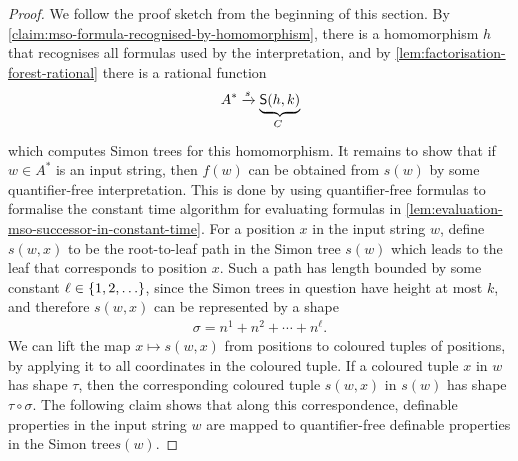 \begin{proof} We follow the proof sketch from  the beginning of this section. By 
    \cref{claim:mso-formula-recognised-by-homomorphism}, there is a homomorphism $h$ that recognises all formulas used by the \mso interpretation, and by \cref{lem:factorisation-forest-rational} there is a rational function
    \begin{align*}
    A^* \xrightarrow s \myunderbrace{\facttype {h,k}}{$C$}
    \end{align*}
    which computes Simon trees for this homomorphism. 
    It remains to show that if $w \in A^*$ is an input string, then  $f(w)$ can be obtained from $s(w)$ by some quantifier-free interpretation.  This is done by using quantifier-free formulas to formalise the constant time algorithm for evaluating \mso formulas in  \cref{lem:evaluation-mso-successor-in-constant-time}.
 For a position $x$  in the input string $w$, define $s(w,x)$  to be the root-to-leaf path in the Simon tree $s(w)$ which leads to the leaf that corresponds to position $x$. Such a path has length bounded by some constant $\ell \in \{1,2,\ldots\}$, since the Simon trees in question have height at most $k$, and therefore $s(w,x)$  can  be represented by a shape 
 \begin{align*}
 \sigma = n^1 + n^2 + \cdots + n^\ell.
 \end{align*}
 We can lift the map $x \mapsto s(w,x)$  from positions to coloured tuples of positions, by applying it to all coordinates in the coloured tuple. If a coloured tuple $x$  in $w$ has shape $\tau$, then the corresponding coloured tuple $s(w,x)$ in $s(w)$ has  shape $\tau \circ \sigma$. The following claim shows that along this correspondence, \mso definable properties in the input string $w$ are mapped to quantifier-free definable properties in the Simon tree$s(w)$.


\end{proof}
